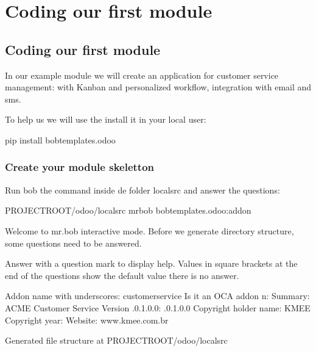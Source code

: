 \documentclass[letterpaper,10pt,english]{sphinxmanual}
\begin{document}
\chapter{Coding our first module}
\label{\detokenize{technical:coding-our-first-module}}

\section{Coding our first module}
\label{\detokenize{technical:id2}}
In our example module we will create an application for customer service management:
with Kanban and personalized workflow, integration with email and sms.

To help us we will use the  install it
in your local user:

\begin{sphinxVerbatim}[commandchars=\\\{\}]
pip install bobtemplates.odoo
\end{sphinxVerbatim}


\subsection{Create your module skeletton}
\label{\detokenize{technical:create-your-module-skeletton}}
Run bob the command inside de folder local\sphinxhyphen{}src and answer the questions:

%
\begin{sphinxVerbatim}[commandchars=\\\{\}]
 PROJECT\PYGZus{}ROOT/odoo/local\PYGZhy{}src
mrbob bobtemplates.odoo:addon

Welcome to mr.bob interactive mode. Before we generate directory structure,
some questions need to be answered.

Answer with a question mark to display help.
Values in square brackets at the end of the questions show the
default value  there is no answer.

\PYGZhy{}\PYGZhy{}\PYGZgt{} Addon name with underscores: customer\PYGZus{}service
\PYGZhy{}\PYGZhy{}\PYGZgt{} Is it an OCA addon \PYG{o}{[}n\PYG{o}{]}:
\PYGZhy{}\PYGZhy{}\PYGZgt{} Summary: ACME Customer Service
\PYGZhy{}\PYGZhy{}\PYGZgt{} Version \PYG{o}{[}.0.1.0.0\PYG{o}{]}: .0.1.0.0
\PYGZhy{}\PYGZhy{}\PYGZgt{} Copyright holder name: KMEE
\PYGZhy{}\PYGZhy{}\PYGZgt{} Copyright year: 
\PYGZhy{}\PYGZhy{}\PYGZgt{} Website: www.kmee.com.br

Generated file structure at PROJECT\PYGZus{}ROOT/odoo/local\PYGZhy{}src
\end{sphinxVerbatim}
\sphinxresetverbatimhllines
\end{document}
